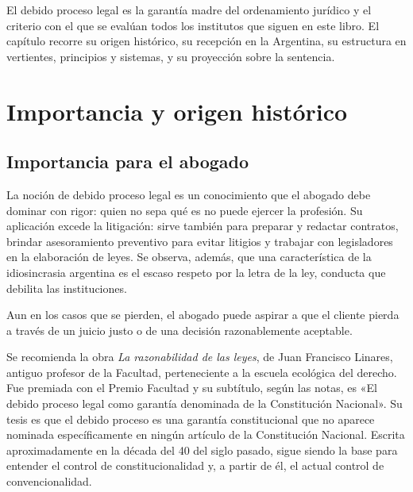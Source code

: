 \documentclass[12pt,oneside]{book}
\begin{document}
El debido proceso legal es la garantía madre del ordenamiento jurídico y el criterio con el que se evalúan todos los institutos que siguen en este libro. El capítulo recorre su origen histórico, su recepción en la Argentina, su estructura en vertientes, principios y sistemas, y su proyección sobre la sentencia.

\section{Importancia y origen histórico}

\subsection{Importancia para el abogado}

La noción de debido proceso legal es un conocimiento que el abogado debe dominar con rigor: quien no sepa qué es no puede ejercer la profesión. Su aplicación excede la litigación: sirve también para preparar y redactar contratos, brindar asesoramiento preventivo para evitar litigios y trabajar con legisladores en la elaboración de leyes. Se observa, además, que una característica de la idiosincrasia argentina es el escaso respeto por la letra de la ley, conducta que debilita las instituciones.

Aun en los casos que se pierden, el abogado puede aspirar a que el cliente pierda a través de un juicio justo o de una decisión razonablemente aceptable.

\begin{nota}
Se recomienda la obra \textit{La razonabilidad de las leyes}, de Juan Francisco Linares, antiguo profesor de la Facultad, perteneciente a la escuela ecológica del derecho. %
Fue premiada con el Premio Facultad y su subtítulo, según las notas, es «El debido proceso legal como garantía denominada de la Constitución Nacional». %
Su tesis es que el debido proceso es una garantía constitucional que no aparece nominada específicamente en ningún artículo de la Constitución Nacional. Escrita aproximadamente en la década del 40 del siglo pasado, sigue siendo la base para entender el control de constitucionalidad y, a partir de él, el actual control de convencionalidad.
\end{nota}
\end{document}
